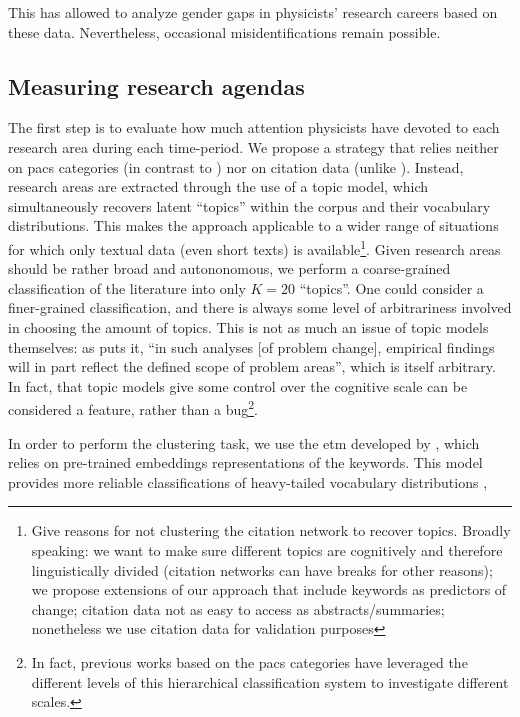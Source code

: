 \documentclass{article}
\begin{document}
This has allowed \citet{Strumia2021} to analyze gender gaps in physicists' research careers based on these data. Nevertheless, occasional misidentifications remain possible.

\subsection{\label{sec:topics}Measuring research agendas}

The first step is to evaluate how much attention physicists have devoted to each research area during each time-period. We propose a strategy that relies neither on \gls{pacs} categories (in contrast to \citealt{Jia2017,Battiston2019,Aleta2019,Tripodi2020}) nor on citation data (unlike \citealt{Zeng2019}). Instead, research areas are extracted through the use of a topic model, which simultaneously recovers latent ``topics'' within the corpus and their vocabulary distributions. This makes the approach applicable to a wider range of situations for which only textual data (even short texts) is available\footnote{Give reasons for not clustering the citation network to recover topics. Broadly speaking: we want to make sure different topics are cognitively and therefore linguistically divided (citation networks can have breaks for other reasons); we propose extensions of our approach that include keywords as predictors of change; citation data not as easy to access as abstracts/summaries; nonetheless we use citation data for validation purposes}.  Given research areas should be rather broad and autononomous, we perform a coarse-grained classification of the literature into only $K=20$ ``topics''. One could consider a finer-grained classification, and there is always some level of arbitrariness involved in choosing the amount of topics. This is not as much an issue of topic models themselves: as \citet{Gieryn1978} puts it, ``in such analyses [of problem change], empirical findings will in part reflect the defined scope of problem areas'', which is itself arbitrary. In fact, that topic models give some control over the cognitive scale can be considered a feature, rather than a bug\footnote{In fact, previous works based on the \gls{pacs} categories have leveraged the different levels of this hierarchical classification system to investigate different scales.}.

In order to perform the clustering task, we use the \gls{etm} developed by \citealt{Dieng2020}, which relies on pre-trained embeddings representations of the keywords. This model provides more reliable classifications of heavy-tailed vocabulary distributions%
,%
\end{document}
